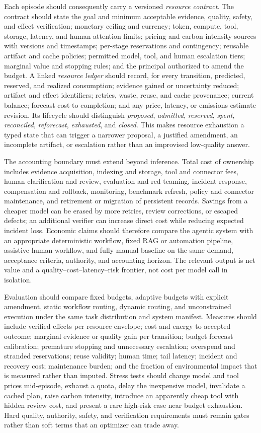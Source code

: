 Each episode should consequently carry a versioned \emph{resource contract}. The contract should state the goal and minimum acceptable evidence, quality, safety, and effect verification; monetary ceiling and currency; token, compute, tool, storage, latency, and human attention limits; pricing and carbon intensity sources with versions and timestamps; per-stage reservations and contingency; reusable artifact and cache policies; permitted model, tool, and human escalation tiers; marginal value and stopping rules; and the principal authorized to amend the budget. A linked \emph{resource ledger} should record, for every transition, predicted, reserved, and realized consumption; evidence gained or uncertainty reduced; artifact and effect identifiers; retries, waste, reuse, and cache provenance; current balance; forecast cost-to-completion; and any price, latency, or emissions estimate revision. Its lifecycle should distinguish \emph{proposed}, \emph{admitted}, \emph{reserved}, \emph{spent}, \emph{reconciled}, \emph{reforecast}, \emph{exhausted}, and \emph{closed}. This makes resource exhaustion a typed state that can trigger a narrower proposal, a justified amendment, an incomplete artifact, or escalation rather than an improvised low-quality answer.

The accounting boundary must extend beyond inference. Total cost of ownership includes evidence acquisition, indexing and storage, tool and connector fees, human clarification and review, evaluation and red teaming, incident response, compensation and rollback, monitoring, benchmark refresh, policy and connector maintenance, and retirement or migration of persistent records. Savings from a cheaper model can be erased by more retries, review corrections, or escaped defects; an additional verifier can increase direct cost while reducing expected incident loss. Economic claims should therefore compare the agentic system with an appropriate deterministic workflow, fixed RAG or automation pipeline, assistive human workflow, and fully manual baseline on the same demand, acceptance criteria, authority, and accounting horizon. The relevant output is net value and a quality--cost--latency--risk frontier, not cost per model call in isolation.

Evaluation should compare fixed budgets, adaptive budgets with explicit amendment, static workflow routing, dynamic routing, and unconstrained execution under the same task distribution and system manifest. Measures should include verified effects per resource envelope; cost and energy to accepted outcome; marginal evidence or quality gain per transition; budget forecast calibration; premature stopping and unnecessary escalation; overspend and stranded reservations; reuse validity; human time; tail latency; incident and recovery cost; maintenance burden; and the fraction of environmental impact that is measured rather than imputed. Stress tests should change model and tool prices mid-episode, exhaust a quota, delay the inexpensive model, invalidate a cached plan, raise carbon intensity, introduce an apparently cheap tool with hidden review cost, and present a rare high-risk case near budget exhaustion. Hard quality, authority, safety, and verification requirements must remain gates rather than soft terms that an optimizer can trade away.

